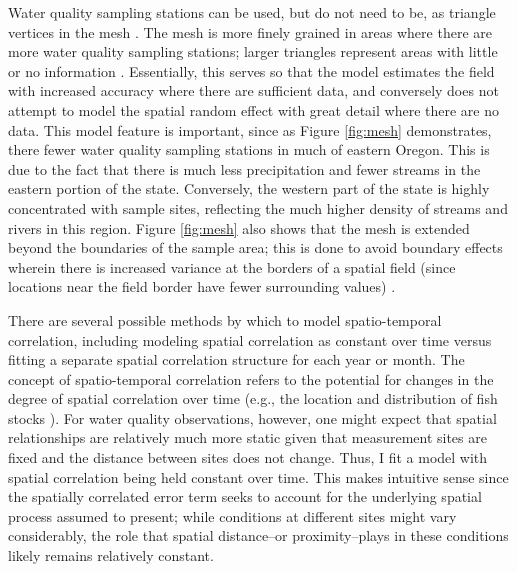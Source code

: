 \documentclass[12pt,a4paper,titlepage]{article}
\begin{document}
Water quality sampling stations can be used, but do not need to be, as triangle vertices in the mesh \parencite{lindgren2011}. The mesh is more finely grained in areas where there are more water quality sampling stations; larger triangles represent areas with little or no information \parencite{cosandey-godin2014}. Essentially, this serves so that the model estimates the field with increased accuracy where there are sufficient data, and conversely does not attempt to model the spatial random effect with great detail where there are no data. This model feature is important, since as Figure \ref{fig:mesh} demonstrates, there fewer water quality sampling stations in much of eastern Oregon. This is due to the fact that there is much less precipitation and fewer streams in the eastern portion of the state. Conversely, the western part of the state is highly concentrated with sample sites, reflecting the much higher density of streams and rivers in this region. Figure \ref{fig:mesh} also shows that the mesh is extended beyond the boundaries of the sample area; this is done to avoid boundary effects wherein there is increased variance at the borders of a spatial field (since locations near the field border have fewer surrounding values) \parencite{lindgren2013}.

There are several possible methods by which to model spatio-temporal correlation, including modeling spatial correlation as constant over time versus fitting a separate spatial correlation structure for each year or month. The concept of spatio-temporal correlation refers to the potential for changes in the degree of spatial correlation over time (e.g., the location and distribution of fish stocks \parencite{cosandey-godin2014}). For water quality observations, however, one might expect that spatial relationships are relatively much more static given that measurement sites are fixed and the distance between sites does not change. Thus, I fit a model with spatial correlation being held constant over time. This makes intuitive sense since the spatially correlated error term seeks to account for the underlying spatial process assumed to present; while conditions at different sites might vary considerably, the role that spatial distance--or proximity--plays in these conditions likely remains relatively constant.
\end{document}
